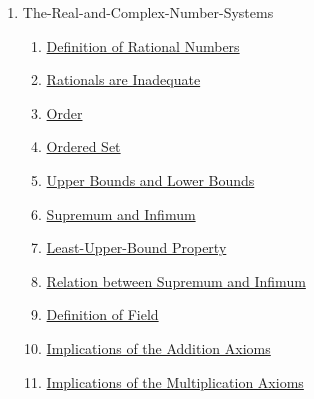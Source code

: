 \clearpage
\renewcommand{\notetitle}{Table of Contents}
\label{toc}
\begin{enumerate}

\item The-Real-and-Complex-Number-Systems
\begin{enumerate}
\item \hyperref[202501131947]{Definition of Rational Numbers}
\item \hyperref[202501132004]{Rationals are Inadequate}
\item \hyperref[202501141228]{Order}
\item \hyperref[202501141241]{Ordered Set}
\item \hyperref[202501141250]{Upper Bounds and Lower Bounds}
\item \hyperref[202501141546]{Supremum and Infimum}
\item \hyperref[202501141632]{Least-Upper-Bound Property}
\item \hyperref[202501141654]{Relation between Supremum and Infimum}
\item \hyperref[202501150657]{Definition of Field}
\item \hyperref[202501150717]{Implications of the Addition Axioms}
\item \hyperref[202501150809]{Implications of the Multiplication Axioms}
\end{enumerate}
\end{enumerate}

\newpage
